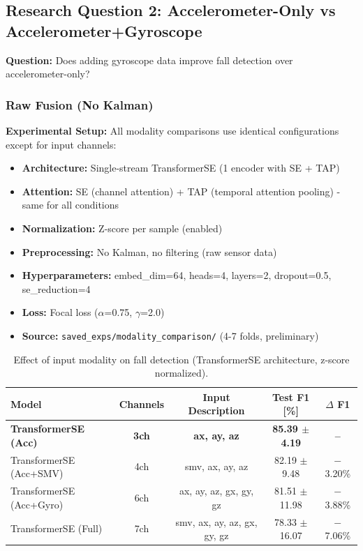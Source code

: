\documentclass{article}
\begin{document}
\subsection{Research Question 2: Accelerometer-Only vs Accelerometer+Gyroscope}

\textbf{Question:} Does adding gyroscope data improve fall detection over accelerometer-only?

\subsubsection{Raw Fusion (No Kalman)}

\textbf{Experimental Setup:} All modality comparisons use identical configurations except for input channels:
\begin{itemize}
    \item \textbf{Architecture:} Single-stream TransformerSE (1 encoder with SE + TAP)
    \item \textbf{Attention:} SE (channel attention) + TAP (temporal attention pooling) - same for all conditions
    \item \textbf{Normalization:} Z-score per sample (enabled)
    \item \textbf{Preprocessing:} No Kalman, no filtering (raw sensor data)
    \item \textbf{Hyperparameters:} embed\_dim=64, heads=4, layers=2, dropout=0.5, se\_reduction=4
    \item \textbf{Loss:} Focal loss ($\alpha$=0.75, $\gamma$=2.0)
    \item \textbf{Source:} \texttt{saved\_exps/modality\_comparison/} (4-7 folds, preliminary)
\end{itemize}

\begin{table}[htbp]
    \centering
    \caption{Effect of input modality on fall detection (TransformerSE architecture, z-score normalized).}
    \label{tab:rq2_raw}
    \begin{tabular}{lcccc}
        \toprule
        \textbf{Model} & \textbf{Channels} & \textbf{Input Description} & \textbf{Test F1 [\%]} & \textbf{$\Delta$ F1} \\
        \midrule
        \textbf{TransformerSE (Acc)} & \textbf{3ch} & \textbf{ax, ay, az} & \textbf{85.39 $\pm$ 4.19} & \textbf{--} \\
        TransformerSE (Acc+SMV) & 4ch & smv, ax, ay, az & 82.19 $\pm$ 9.48 & $-$3.20\% \\
        TransformerSE (Acc+Gyro) & 6ch & ax, ay, az, gx, gy, gz & 81.51 $\pm$ 11.98 & $-$3.88\% \\
        TransformerSE (Full) & 7ch & smv, ax, ay, az, gx, gy, gz & 78.33 $\pm$ 16.07 & $-$7.06\% \\
        \bottomrule
    \end{tabular}
\end{table}
\end{document}
